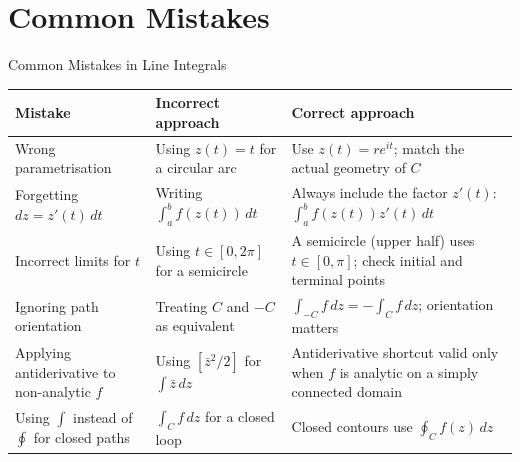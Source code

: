 \documentclass[12pt,a4paper]{article}
\begin{document}
\section{Common Mistakes}
\begin{mistakebox}{Common Mistakes in Line Integrals}
\begin{tabular}{@{}p{}p{}p{}@{}}
\toprule
\textbf{Mistake} & \textbf{Incorrect approach} & \textbf{Correct approach} \\
\midrule
Wrong parametrisation &
  Using $z(t)=t$ for a circular arc &
  Use $z(t)=re^{it}$; match the actual geometry of $C$ \\
\midrule
Forgetting $dz = z'(t)\,dt$ &
  Writing $\int_a^b f(z(t))\,dt$ &
  Always include the factor $z'(t)$:
  $\int_a^b f(z(t))z'(t)\,dt$ \\
\midrule
Incorrect limits for $t$ &
  Using $t\in[0,2\pi]$ for a semicircle &
  A semicircle (upper half) uses $t\in[0,\pi]$;
  check initial and terminal points \\
\midrule
Ignoring path orientation &
  Treating $C$ and $-C$ as equivalent &
  $\int_{-C}f\,dz = -\int_C f\,dz$; orientation matters \\
\midrule
Applying antiderivative to non-analytic $f$ &
  Using $[\bar{z}^2/2]$ for $\int\bar{z}\,dz$ &
  Antiderivative shortcut valid only when $f$ is analytic on
  a simply connected domain \\
\midrule
Using $\int$ instead of $\oint$ for closed paths &
  $\int_C f\,dz$ for a closed loop &
  Closed contours use $\oint_C f(z)\,dz$ \\
\bottomrule
\end{tabular}
\end{mistakebox}

\end{document}

